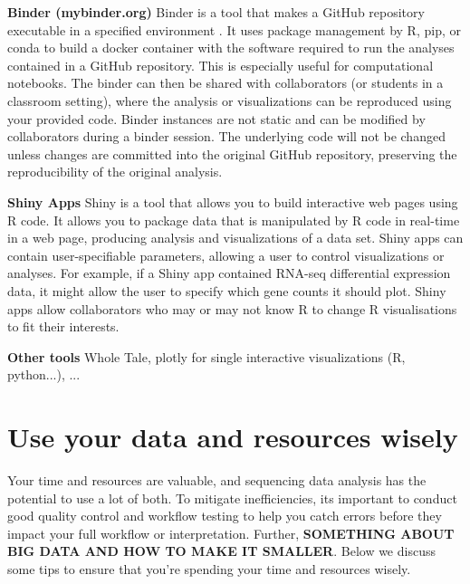 \documentclass[10pt,letterpaper]{article}
\begin{document}
\begin{greybox}{
 \textbf{Binder (mybinder.org)} Binder is a tool that makes a GitHub repository executable in a specified environment \cite{Jupyter2018}. It uses package management by R, pip, or conda to build a docker container with the software required to run the analyses contained in a GitHub repository. This is especially useful for computational notebooks. The binder can then be shared with collaborators (or students in a classroom setting), where the analysis or visualizations can be reproduced using your provided code. Binder instances are not static and can be modified by collaborators during a binder session. The underlying code will not be changed unless changes are committed into the original GitHub repository, preserving the reproducibility of the original analysis.
 
 \textbf{Shiny Apps} Shiny is a tool that allows you to build interactive web pages using R code. It allows you to package data that is manipulated  by R code in real-time in a web page, producing analysis and visualizations of a data set. Shiny apps can contain user-specifiable parameters, allowing a user to control visualizations or analyses. For example, if a Shiny app contained RNA-seq differential expression data, it might allow the user to specify which gene counts it should plot. Shiny apps allow collaborators who may or may not know R to change R visualisations to fit their interests.   
 
 \textbf{Other tools} Whole Tale, plotly for single interactive visualizations (R, python...), ...
 

}
\end{greybox}

\section*{Use your data and resources wisely}

Your time and resources are valuable, and sequencing data analysis has the potential to use a lot of both. To mitigate inefficiencies, its important to conduct good quality control and workflow testing to help you catch errors before they impact your full workflow or interpretation. Further, \textbf{SOMETHING ABOUT BIG DATA AND HOW TO MAKE IT SMALLER}. Below we discuss some tips to ensure that you're spending your time and resources wisely. 
\end{document}
